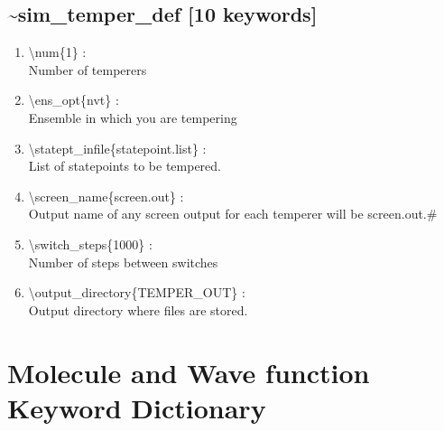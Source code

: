 \documentclass[12pt,titlepage]{article}
\begin{document}
\subsection*{\bf \~{}sim\_temper\_def [10 keywords]}

\begin{enumerate}

 \vspace{0.15in} 
 \item  \textbackslash{}num\{1\} : \\
   Number of temperers

 \vspace{0.15in} 
 \item  \textbackslash{}ens\_opt\{nvt\} : \\
   Ensemble in which you are tempering

 \vspace{0.15in} 
 \item  \textbackslash{}statept\_infile\{statepoint.list\} : \\
   List of statepoints to be tempered.

 \vspace{0.15in} 
 \item  \textbackslash{}screen\_name\{screen.out\} : \\
   Output name of any screen output for each temperer will be screen.out.\#

 \vspace{0.15in} 
 \item  \textbackslash{}switch\_steps\{1000\} : \\
   Number of steps between switches

 \vspace{0.15in} 
 \item  \textbackslash{}output\_directory\{TEMPER\_OUT\} : \\
   Output directory where files are stored.

\end{enumerate}
\newpage



\section{\bf Molecule and Wave function Keyword Dictionary} 
\end{document}
